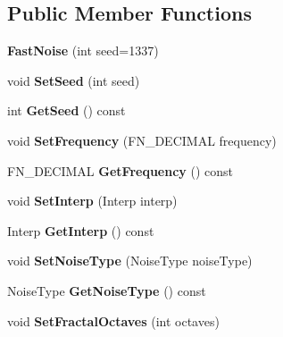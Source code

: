 \subsection*{Public Member Functions}
\begin{DoxyCompactItemize}
\item 
\mbox{\label{classFastNoise_abe90bb52b45e18122d109dcb4b7fa987}} 
{\bfseries Fast\+Noise} (int seed=1337)
\item 
\mbox{\label{classFastNoise_a2efb595ec8bc18541a3739c6bd9b7567}} 
void {\bfseries Set\+Seed} (int seed)
\item 
\mbox{\label{classFastNoise_ade53a483f6d63837f5be13867190363a}} 
int {\bfseries Get\+Seed} () const
\item 
\mbox{\label{classFastNoise_a4a16af07f18788c25e7515a9e1d2c53c}} 
void {\bfseries Set\+Frequency} (F\+N\+\_\+\+D\+E\+C\+I\+M\+AL frequency)
\item 
\mbox{\label{classFastNoise_a102aa79881c39779145806dcd48f1a9a}} 
F\+N\+\_\+\+D\+E\+C\+I\+M\+AL {\bfseries Get\+Frequency} () const
\item 
\mbox{\label{classFastNoise_a5db11de37bebf7a99f6788a9ae9d7bf9}} 
void {\bfseries Set\+Interp} (Interp interp)
\item 
\mbox{\label{classFastNoise_ab7cd259a2864b29a824deaf3c67a3b75}} 
Interp {\bfseries Get\+Interp} () const
\item 
\mbox{\label{classFastNoise_ae6cb2170c036bde4bc56ad7d0303e4bb}} 
void {\bfseries Set\+Noise\+Type} (Noise\+Type noise\+Type)
\item 
\mbox{\label{classFastNoise_aea513db44077037f31452d05f06d11e0}} 
Noise\+Type {\bfseries Get\+Noise\+Type} () const
\item 
\mbox{\label{classFastNoise_a7c7254a79a239e8014fd0078cee007dd}} 
void {\bfseries Set\+Fractal\+Octaves} (int octaves)
\item 
\mbox{\label{classFastNoise_a05f76e380ba40c1b90bbe1ca5b3ac3e1}} 

\end{DoxyCompactItemize}
